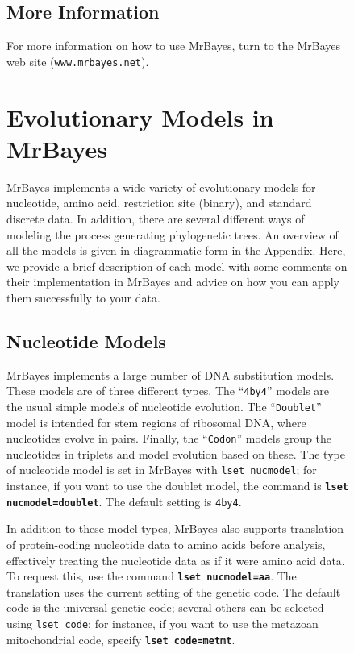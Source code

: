 \documentclass[12pt]{book}
\newcommand{\ttt}[1]{\texttt{#1}}
\newcommand{\tb}[1]{\ttt{\textbf{#1}}}
\begin{document}
\begin{figure}[h]
\section{More Information}

For more information on how to use MrBayes, turn to the MrBayes web site
(\ttt{www.mrbayes.net}).


\chapter{Evolutionary Models in MrBayes}
\label{evolutionaryModels}

MrBayes implements a wide variety of evolutionary models for nucleotide, amino acid, restriction
site (binary), and standard discrete data. In addition, there are several different ways of
modeling the process generating phylogenetic trees. An overview of all the models is given in
diagrammatic form in the Appendix. Here, we provide a brief description of each model with some
comments on their implementation in MrBayes and advice on how you can apply them successfully to
your data.

\section{Nucleotide Models}

MrBayes implements a large number of DNA substitution models. These models are of three different
types. The ``\ttt{4by4}'' models are the usual simple models of nucleotide evolution. The
``\ttt{Doublet}'' model is intended for stem regions of ribosomal DNA, where nucleotides evolve in
pairs. Finally, the ``\ttt{Codon}'' models group the nucleotides in triplets and model evolution
based on these. The type of nucleotide model is set in MrBayes with \ttt{lset nucmodel}; for
instance, if you want to use the doublet model, the command is \tb{lset nucmodel=doublet}. The
default setting is \ttt{4by4}.

In addition to these model types, MrBayes also supports translation of protein-coding nucleotide
data to amino acids before analysis, effectively treating the nucleotide data as if it were amino
acid data. To request this, use the command \tb{lset nucmodel=aa}. The translation uses the current
setting of the genetic code. The default code is the universal genetic code; several others can be
selected using \ttt{lset code}; for instance, if you want to use the metazoan mitochondrial code,
specify \tb{lset code=metmt}.


\end{figure}
\end{document}
